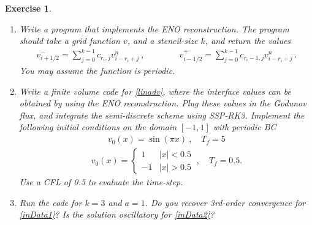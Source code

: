 \documentclass[10pt,letterpaper]{article}
\newcommand{\ol}{} %
\theoremstyle{break}
\newtheorem{exercise}{Exercise}
\begin{document}
\begin{exercise}
\begin{enumerate}
		\item
		Write a program that implements the ENO reconstruction. 
		The program should take a grid function $\ol v$, and a stencil-size $k$, and return the values
		\begin{gather}%
			v_{i+1/2}^-=\sum_{j=0}^{k-1} c_{r_i,j} \ol v_{i-r_i+j}^n\ ,
			\qquad\qquad
			v_{i-1/2}^+=\sum_{j=0}^{k-1} c_{r_i-1,j}\ol v_{i-r_i+j}^n\ .
		\end{gather}%
		You may assume the function is periodic.

		\item 
		Write a finite volume code for \eqref{linadv}, 
		where the interface values can be obtained by using the ENO reconstruction. 
		Plug these values in the Godunov flux, and integrate the semi-discrete scheme using SSP-RK3. 
		Implement the following initial conditions on the domain $[-1,1]$ with periodic BC
		\begin{gather} \label{inData1}
			v_0(x)=\sin(\pi x)\ ,  
			\quad
			T_f = 5
		\end{gather}%
		\begin{gather} \label{inData2}
			v_0(x)=\begin{cases}
				1 & |x|<0.5\\
				-1 & |x|>0.5
			\end{cases}\ ,
			\quad
			T_f = 0.5.
		\end{gather}%
		Use a CFL of 0.5 to evaluate the time-step. 

		\item
		Run the code for $k=3$ and $a=1$. 
		Do you recover 3rd-order convergence for \eqref{inData1}? 
		Is the solution oscillatory for \eqref{inData2}?
	\end{enumerate}
\end{exercise}
\end{document}
